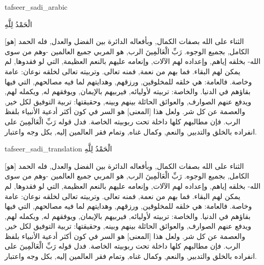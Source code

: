 \begin{taggedblock}{tafseer_sadi_arabic}
\begin{Arabic}
{ الْحَمْدُ لِلَّهِ }

[هو]
الثناء على الله بصفات الكمال, وبأفعاله الدائرة بين الفضل والعدل, فله الحمد الكامل, بجميع الوجوه.
{ رَبِّ الْعَالَمِينَ }
الرب, هو المربي جميع العالمين -وهم من سوى الله- بخلقه إياهم, وإعداده لهم الآلات, وإنعامه عليهم بالنعم العظيمة, التي لو فقدوها, لم يمكن لهم البقاء. فما بهم من نعمة, فمنه تعالى. وتربيته تعالى لخلقه نوعان: عامة وخاصة. فالعامة: هي خلقه للمخلوقين, ورزقهم, وهدايتهم لما فيه مصالحهم, التي فيها بقاؤهم في الدنيا. والخاصة: تربيته لأوليائه, فيربيهم بالإيمان, ويوفقهم له, ويكمله لهم, ويدفع عنهم الصوارف, والعوائق الحائلة بينهم وبينه, وحقيقتها: تربية التوفيق لكل خير, والعصمة عن كل شر. ولعل هذا
[المعنى]
هو السر في كون أكثر أدعية الأنبياء بلفظ الرب. فإن مطالبهم كلها داخلة تحت ربوبيته الخاصة. فدل قوله
{ رَبِّ الْعَالَمِينَ }
على انفراده بالخلق والتدبير, والنعم, وكمال غناه, وتمام فقر العالمين إليه, بكل وجه واعتبار.
\end{Arabic}
\end{taggedblock}
\begin{taggedblock}{tafseer_sadi_translation}
{ الْحَمْدُ لِلَّهِ }

[هو]
الثناء على الله بصفات الكمال, وبأفعاله الدائرة بين الفضل والعدل, فله الحمد الكامل, بجميع الوجوه.
{ رَبِّ الْعَالَمِينَ }
الرب, هو المربي جميع العالمين -وهم من سوى الله- بخلقه إياهم, وإعداده لهم الآلات, وإنعامه عليهم بالنعم العظيمة, التي لو فقدوها, لم يمكن لهم البقاء. فما بهم من نعمة, فمنه تعالى. وتربيته تعالى لخلقه نوعان: عامة وخاصة. فالعامة: هي خلقه للمخلوقين, ورزقهم, وهدايتهم لما فيه مصالحهم, التي فيها بقاؤهم في الدنيا. والخاصة: تربيته لأوليائه, فيربيهم بالإيمان, ويوفقهم له, ويكمله لهم, ويدفع عنهم الصوارف, والعوائق الحائلة بينهم وبينه, وحقيقتها: تربية التوفيق لكل خير, والعصمة عن كل شر. ولعل هذا
[المعنى]
هو السر في كون أكثر أدعية الأنبياء بلفظ الرب. فإن مطالبهم كلها داخلة تحت ربوبيته الخاصة. فدل قوله
{ رَبِّ الْعَالَمِينَ }
على انفراده بالخلق والتدبير, والنعم, وكمال غناه, وتمام فقر العالمين إليه, بكل وجه واعتبار.
\end{taggedblock}

\begin{comment}
Please use the following for footnotes:- Sample\footnoteQ{Text of Qur'an footnote goes here.}.
Sample\footnoteT{Text of Tafseer footnote goes here.}.
\end{comment}